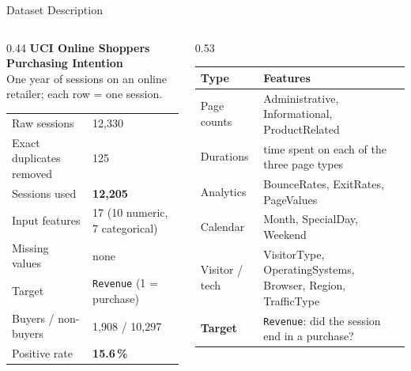 \documentclass[aspectratio=169,11pt]{beamer}
\begin{document}
\begin{frame}{Dataset Description}
  \begin{columns}[T,onlytextwidth]
    \begin{column}{0.44\textwidth}
      \textbf{UCI Online Shoppers Purchasing Intention}\\[2pt]
      {\footnotesize\color{muted}One year of sessions on an online retailer; each row = one session.}
      \vspace{6pt}

      \footnotesize
      \begin{tabular}{@{}ll@{}}
        \toprule
        Raw sessions & 12,330 \\
        Exact duplicates removed & 125 \\
        Sessions used & \textbf{12,205} \\
        Input features & 17 (10 numeric, 7 categorical) \\
        Missing values & none \\
        Target & \texttt{Revenue} (1 = purchase) \\
        Buyers / non-buyers & 1,908 / 10,297 \\
        Positive rate & \textbf{15.6\,\%} \\
        \bottomrule
      \end{tabular}
    \end{column}
    \begin{column}{0.53\textwidth}
      \footnotesize
      \begin{tabular}{@{}p{20mm}p{55mm}@{}}
        \toprule
        \textbf{Type} & \textbf{Features} \\
        \midrule
        Page counts & Administrative, Informational, ProductRelated \\
        Durations   & time spent on each of the three page types \\
        Analytics   & BounceRates, ExitRates, PageValues \\
        Calendar    & Month, SpecialDay, Weekend \\
        Visitor / tech & VisitorType, OperatingSystems, Browser, Region, TrafficType \\
        \midrule
        \textbf{Target} & \texttt{Revenue}: did the session end in a purchase? \\
        \bottomrule
      \end{tabular}
    \end{column}
  \end{columns}
\end{frame}
\end{document}
